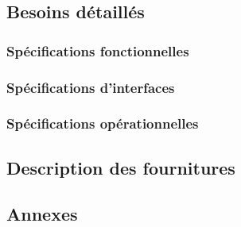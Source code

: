 \documentclass[asi]{picINSA}
\begin{document}
\chapter{Besoins détaillés}

\section{Spécifications fonctionnelles}
\label{spec_fonct}


\section{Spécifications d'interfaces}
\label{spec_interface}


\section{Spécifications opérationnelles}
\label{spec_ope}


\chapter{Description des fournitures}
\label{desc_fournitures}


\begin{appendix}
\part*{Annexes}

\listoffigures
{}
	 
\listoftables
{}
\end{appendix}
\pageQuatriemeCouverture
\end{document}
